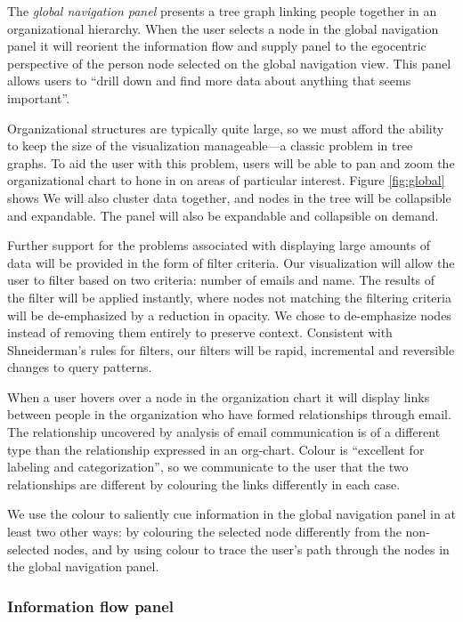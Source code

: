 \documentclass{soups}
\begin{document}
The \emph{global navigation panel} presents a tree graph linking people together in an organizational hierarchy. When the user selects a node in the global navigation panel it will reorient the information flow and supply panel to the egocentric perspective of the person node selected on the global navigation view. This panel allows users to “drill down and find more data about anything that seems important”\cite{ware2012information}.

Organizational structures are typically quite large, so we must afford the ability to keep the size of the visualization manageable---a classic problem in tree graphs\cite{herman2000graph}.  To aid the user with this problem, users will be able to pan and zoom the organizational chart to hone in on areas of particular interest. Figure \ref{fig:global} shows We will also cluster data together, and nodes in the tree will be collapsible and expandable. The panel will also be expandable and collapsible on demand.

Further support for the problems associated with displaying large amounts of data will be provided in the form of filter criteria.  Our visualization will allow the user to filter based on two criteria: number of emails and name. The results of the filter will be applied instantly, where nodes not matching the filtering criteria will be de-emphasized by a reduction in opacity. We chose to de-emphasize nodes instead of removing them entirely to preserve context. Consistent with Shneiderman's rules for filters, our filters will be rapid, incremental and reversible changes to query patterns\cite{ahlberg1994visual}.

When a user hovers over a node in the organization chart it will display links between people in the organization who have formed relationships through email. The relationship uncovered by analysis of email communication is of a different type than the relationship expressed in an org-chart. Colour is “excellent for labeling and categorization”\cite{ware2012information}, so we communicate to the user that the two relationships are different by colouring the links differently in each case.

We use the colour to saliently cue\cite{ware2012information} information in the global navigation panel in at least two other ways: by colouring the selected node differently from the non-selected nodes, and by using colour to trace the user's path through the nodes in the global navigation panel. 

\subsubsection{Information flow panel}
\end{document}
